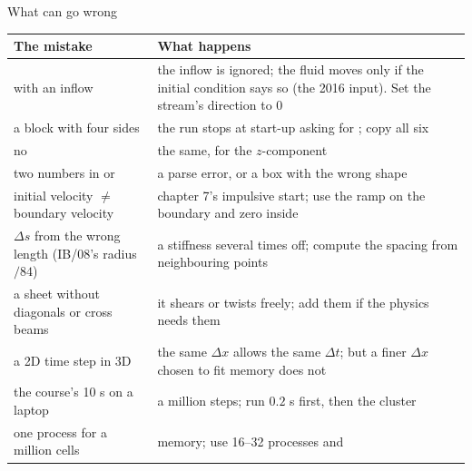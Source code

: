 \documentclass[aspectratio=169,11pt]{beamer}
\begin{document}
\begin{frame}{What can go wrong}
\label{fr:wrong}
\scriptsize
\begin{tabular}{@{}L{0.32\textwidth}L{0.6\textwidth}@{}}
\toprule
The mistake & What happens\\
\midrule
{} with an inflow & the inflow is ignored; the fluid moves only if the initial condition says so (the 2016 input). Set the stream's direction to 0\\
a  block with four sides & the run stops at start-up asking for ; copy all six\\
no  & the same, for the $z$-component\\
two numbers in  or  & a parse error, or a box with the wrong shape\\
initial velocity $\neq$ boundary velocity & chapter 7's impulsive start; use the ramp on the boundary and zero inside\\
$\Delta s$ from the wrong length (IB/08's radius$/84$) & a stiffness several times off; compute the spacing from neighbouring points\\
a sheet without diagonals or cross beams & it shears or twists freely; add them if the physics needs them\\
a 2D time step in 3D & the same $\Delta x$ allows the same $\Delta t$; but a finer $\Delta x$ chosen to fit memory does not\\
the course's 10 s on a laptop & a million steps; run $0.2$ s first, then the cluster\\
one process for a million cells & memory; use 16--32 processes and \\
\bottomrule
\end{tabular}
\end{frame}
\end{document}
